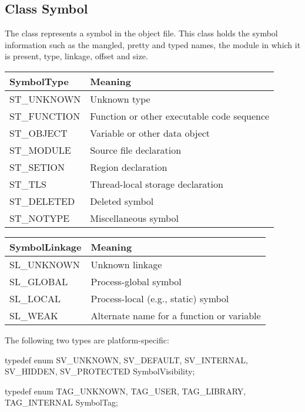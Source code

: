 \subsection{Class Symbol}

The  class represents a symbol in the object file. This class holds the symbol information such as the mangled, pretty and typed names, the module in which it is present, type, linkage, offset and size.


\begin{center}
\begin{tabular}{ll}
\toprule
SymbolType & Meaning \\
\midrule
ST\_UNKNOWN & Unknown type \\
ST\_FUNCTION & Function or other executable code sequence \\
ST\_OBJECT & Variable or other data object \\
ST\_MODULE & Source file declaration \\
ST\_SETION & Region declaration \\
ST\_TLS & Thread-local storage declaration \\
ST\_DELETED & Deleted symbol \\
ST\_NOTYPE & Miscellaneous symbol \\
\bottomrule
\end{tabular}
\end{center}


\begin{center}
\begin{tabular}{ll}
\toprule
SymbolLinkage & Meaning \\
\midrule
SL\_UNKNOWN & Unknown linkage \\
SL\_GLOBAL & Process-global symbol \\
SL\_LOCAL & Process-local (e.g., static) symbol \\
SL\_WEAK & Alternate name for a function or variable \\
\bottomrule
\end{tabular}
\end{center}

The following two types are platform-specific:

\begin{apient}
typedef enum {
    SV_UNKNOWN,
    SV_DEFAULT,
    SV_INTERNAL,
    SV_HIDDEN,
    SV_PROTECTED
} SymbolVisibility;
\end{apient}

\begin{apient}
typedef enum {
    TAG_UNKNOWN,
    TAG_USER,
    TAG_LIBRARY,
    TAG_INTERNAL
} SymbolTag; 
\end{apient}

